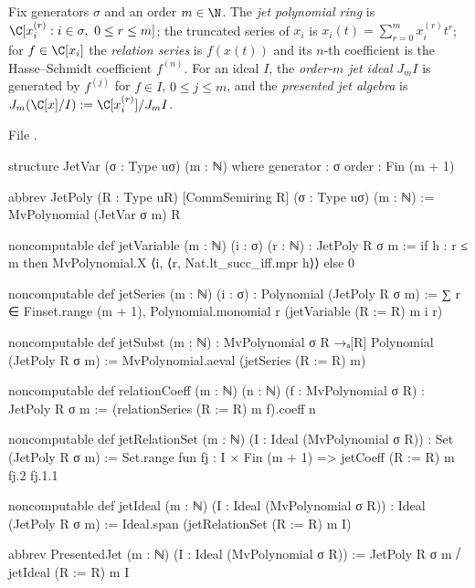 \begin{definition}\label{l11:def:jets}
Fix generators $\sigma$ and an order $m\in\N$. The \emph{jet polynomial ring} is
$\C[x_i^{(r)} : i\in\sigma,\ 0\le r\le m]$; the truncated series of $x_i$ is $x_i(t) = \sum_{r=0}^mx_i^{(r)}t^r$;
for $f\in\C[x_i]$ the \emph{relation series} is $f(x(t))$ and its $n$-th coefficient is the Hasse--Schmidt
coefficient $f^{(n)}$. For an ideal $I$, the \emph{order-$m$ jet ideal} $J_mI$ is generated by $f^{(j)}$ for $f\in I$,
$0\le j\le m$, and the \emph{presented jet algebra} is $J_m(\C[x]/I) := \C[x_i^{(r)}]/J_mI$.
\end{definition}
\noindent File .
\begin{leancode}
structure JetVar (σ : Type uσ) (m : ℕ) where
  generator : σ
  order : Fin (m + 1)

abbrev JetPoly (R : Type uR) [CommSemiring R] (σ : Type uσ) (m : ℕ) :=
  MvPolynomial (JetVar σ m) R

noncomputable def jetVariable (m : ℕ) (i : σ) (r : ℕ) : JetPoly R σ m :=
  if h : r ≤ m then
    MvPolynomial.X ⟨i, ⟨r, Nat.lt_succ_iff.mpr h⟩⟩
  else
    0

noncomputable def jetSeries (m : ℕ) (i : σ) : Polynomial (JetPoly R σ m) :=
  ∑ r ∈ Finset.range (m + 1), Polynomial.monomial r (jetVariable (R := R) m i r)

noncomputable def jetSubst (m : ℕ) :
    MvPolynomial σ R →ₐ[R] Polynomial (JetPoly R σ m) :=
  MvPolynomial.aeval (jetSeries (R := R) m)

noncomputable def relationCoeff (m : ℕ) (n : ℕ) (f : MvPolynomial σ R) :
    JetPoly R σ m :=
  (relationSeries (R := R) m f).coeff n

noncomputable def jetRelationSet (m : ℕ) (I : Ideal (MvPolynomial σ R)) :
    Set (JetPoly R σ m) :=
  Set.range fun fj : I × Fin (m + 1) => jetCoeff (R := R) m fj.2 fj.1.1

noncomputable def jetIdeal (m : ℕ) (I : Ideal (MvPolynomial σ R)) :
    Ideal (JetPoly R σ m) :=
  Ideal.span (jetRelationSet (R := R) m I)

abbrev PresentedJet (m : ℕ) (I : Ideal (MvPolynomial σ R)) :=
  JetPoly R σ m ⧸ jetIdeal (R := R) m I
\end{leancode}

